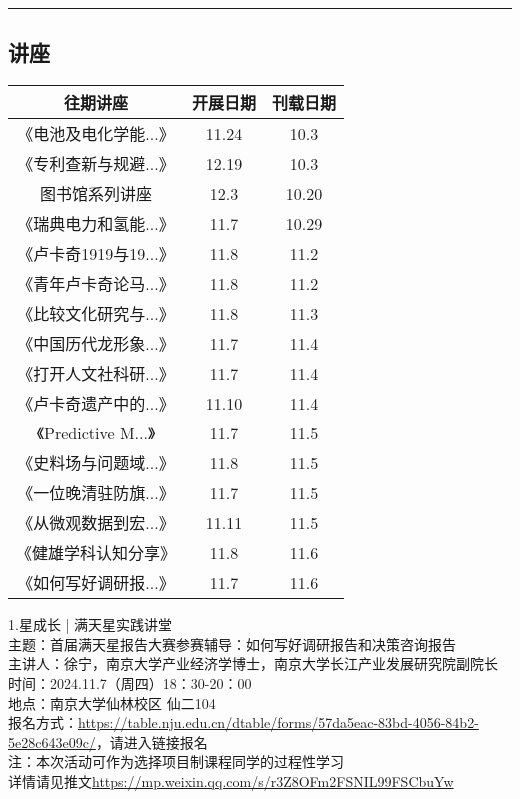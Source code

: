 \documentclass[letterpaper, 12pt]{article}
\begin{document}
\hrule
\pagebreak
\begin{multicols}{2}

\section{讲座}
\begin{tabular}{|c|c|c|}
    \hline
    往期讲座 & 开展日期 & 刊载日期\\
    \hline\hline
    《电池及电化学能...》 & 11.24 & 10.3\\
    《专利查新与规避...》 & 12.19 & 10.3\\
    图书馆系列讲座 & 12.3 & 10.20\\
    《瑞典电力和氢能...》 & 11.7 & 10.29\\
    《卢卡奇1919与19...》 & 11.8 & 11.2\\
    《青年卢卡奇论马...》 & 11.8 & 11.2\\
    《比较文化研究与...》 & 11.8 & 11.3\\
    《中国历代龙形象...》 & 11.7 & 11.4\\
    《打开人文社科研...》 & 11.7 & 11.4\\
    《卢卡奇遗产中的...》 & 11.10 & 11.4\\
    《Predictive M...》 & 11.7 & 11.5\\
    《史料场与问题域...》 & 11.8 & 11.5\\
    《一位晚清驻防旗...》& 11.7 & 11.5\\
    《从微观数据到宏...》& 11.11 & 11.5\\
    《健雄学科认知分享》 & 11.8 & 11.6\\
    《如何写好调研报...》 & 11.7 & 11.6\\
    \hline
\end{tabular}

1.星成长 | 满天星实践讲堂\\
主题：首届满天星报告大赛参赛辅导：如何写好调研报告和决策咨询报告\\
主讲人：徐宁，南京大学产业经济学博士，南京大学长江产业发展研究院副院长\\
时间：2024.11.7（周四）18：30-20：00\\
地点：南京大学仙林校区 仙二104\\
报名方式：\url{https://table.nju.edu.cn/dtable/forms/57da5eac-83bd-4056-84b2-5e28c643e09c/}，请进入链接报名\\
注：本次活动可作为选择项目制课程同学的过程性学习\\
详情请见推文\url{https://mp.weixin.qq.com/s/r3Z8OFm2FSNIL99FSCbuYw}\\


\end{multicols}
\end{document}
